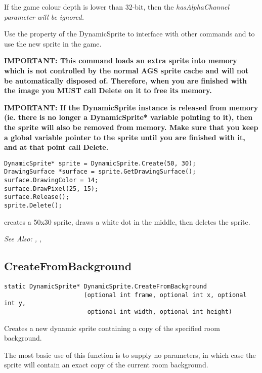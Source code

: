 If the game colour depth is lower than 32-bit, then the \it{hasAlphaChannel}
parameter will be ignored.

Use the  property of the DynamicSprite to
interface with other commands and to use the new sprite in the game.

\bf{IMPORTANT:} This command loads an extra sprite into memory which is not controlled
by the normal AGS sprite cache and will not be automatically disposed of. Therefore, when
you are finished with the image you \bf{MUST} call Delete on it to free its memory.

\bf{IMPORTANT:} If the DynamicSprite instance is released from memory (ie. there is
no longer a DynamicSprite* variable pointing to it), then the sprite will also be
removed from memory. Make sure that you keep a global variable pointer to the sprite
until you are finished with it, and at that point call Delete.

\begin{verbatim}
DynamicSprite* sprite = DynamicSprite.Create(50, 30);
DrawingSurface *surface = sprite.GetDrawingSurface();
surface.DrawingColor = 14;
surface.DrawPixel(25, 15);
surface.Release();
sprite.Delete();
\end{verbatim}
creates a 50x30 sprite, draws a white dot in the middle, then deletes the sprite.

\it{See Also:} ,
,



\subsection{CreateFromBackground}\label{DynamicSprite.CreateFromBackground}%

\begin{verbatim}
static DynamicSprite* DynamicSprite.CreateFromBackground
                      (optional int frame, optional int x, optional int y,
                       optional int width, optional int height)
\end{verbatim}
Creates a new dynamic sprite containing a copy of the specified room background.

The most basic use of this function is to supply no parameters, in which case
the sprite will contain an exact copy of the current room background.

